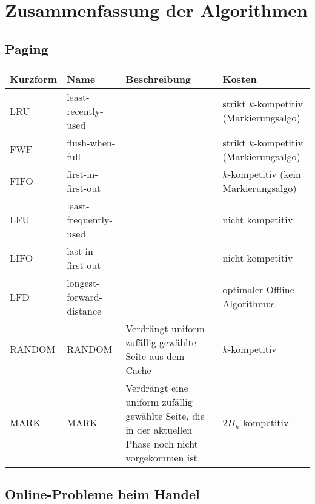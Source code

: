 \chapter{Zusammenfassung der Algorithmen}

\section{Paging}
\begin{tabularx}{\textwidth}{|l|X|X|X|} \hline
Kurzform & Name & Beschreibung & Kosten\\ \hline \hline
LRU  & least-recently-used      & & strikt $k$-kompetitiv (Markierungsalgo) \\ \hline
FWF  & flush-when-full          & & strikt $k$-kompetitiv (Markierungsalgo) \\ \hline
FIFO & first-in-first-out       & & $k$-kompetitiv (kein Markierungsalgo) \\ \hline
LFU  & least-frequently-used    & & nicht kompetitiv\\ \hline
LIFO & last-in-first-out        & & nicht kompetitiv\\ \hline
LFD  & longest-forward-distance & & optimaler Offline-Algorithmus \\ \hline
RANDOM & RANDOM & Verdrängt uniform zufällig gewählte Seite aus dem Cache & $k$-kompetitiv\\ \hline
MARK & MARK & Verdrängt eine uniform zufällig gewählte Seite, die in der aktuellen Phase noch nicht vorgekommen ist & $2H_k$-kompetitiv \\ \hline
\end{tabularx}



\section{Online-Probleme beim Handel}

